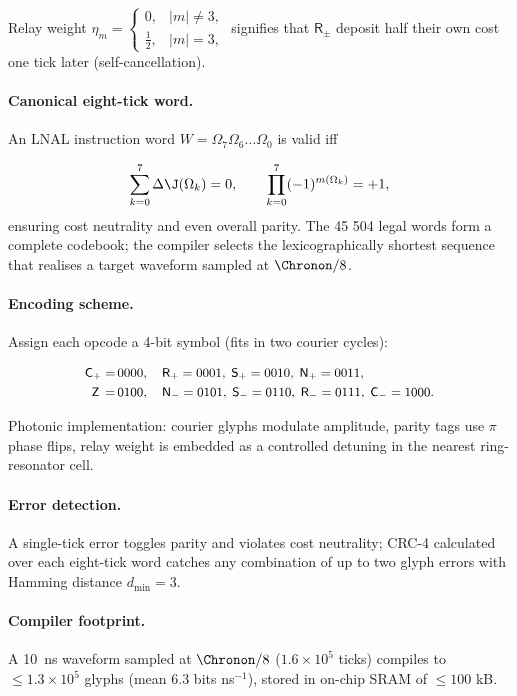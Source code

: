 \documentclass[11pt,oneside]{book}
\begin{document}
Relay weight
\(
   \eta_{m}
   =
   \begin{cases}
      0,& |m|\neq3,\\[2pt]
      \tfrac12,& |m|=3,
   \end{cases}
\)
signifies that $\mathsf{R_{\pm}}$ deposit half their own cost one tick
later (self-cancellation).

\paragraph{Canonical eight-tick word.}
An LNAL instruction word
\(
   W = \Omega_{7}\Omega_{6}\dots\Omega_{0}
\)
is valid iff  

\[
   \sum_{k=0}^{7}\Delta\J(\Omega_{k}) = 0,
   \qquad
   \prod_{k=0}^{7}(-1)^{m(\Omega_{k})} = +1,
\]
ensuring cost neutrality and even overall parity.  
The 45 504 legal words form a complete codebook; the compiler selects
the lexicographically shortest sequence that realises a target
waveform sampled at \(\Chronon/8\).

\paragraph{Encoding scheme.}
Assign each opcode a 4-bit symbol (fits in two courier cycles):

\[
\small
\begin{aligned}
\mathsf{C_{+}}=&\,0000,\quad
\mathsf{R_{+}}=0001,\;
\mathsf{S_{+}}=0010,\;
\mathsf{N_{+}}=0011,\\
\mathsf{Z}\,=&\,0100,\quad
\mathsf{N_{-}}=0101,\;
\mathsf{S_{-}}=0110,\;
\mathsf{R_{-}}=0111,\;
\mathsf{C_{-}}=1000.
\end{aligned}
\]

Photonic implementation: courier glyphs modulate amplitude,
parity tags use $\pi$ phase flips, relay weight is embedded as a
controlled detuning in the nearest ring-resonator cell.

\paragraph{Error detection.}
A single-tick error toggles parity and violates cost neutrality;
CRC-4 calculated over each eight-tick word catches any combination of
up to two glyph errors with Hamming distance $d_{\min}=3$.

\paragraph{Compiler footprint.}
A \SI{10}{ns} waveform sampled at \(\Chronon/8\)
(\(1.6\times10^{5}\) ticks) compiles to  
\(\le1.3\times10^{5}\) glyphs (mean $6.3$ bits ns\(^{-1}\)),
stored in on-chip SRAM of \(\le100\) kB.
\end{document}
